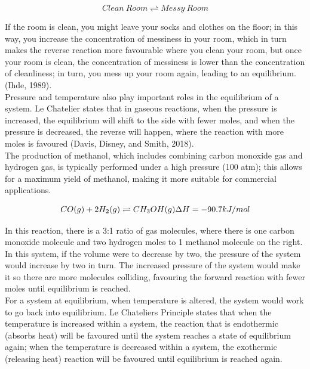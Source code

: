 \begin{figure}[htp]
    \centering
    \[
        Clean \ Room \rightleftharpoons Messy \ Room
    \]
    \caption{}
    \label{fig:enter-label}
\end{figure}

If the room is clean, you might leave your socks and clothes on the floor; in this way, you increase the concentration of messiness in your room, which in turn makes the reverse reaction more favourable where you clean your room, but once your room is clean, the concentration of messiness is lower than the concentration of cleanliness; in turn, you mess up your room again, leading to an equilibrium. (Ihde, 1989). \\

Pressure and temperature also play important roles in the equilibrium of a system. Le Chatelier states that in gaseous reactions, when the pressure is increased, the equilibrium will shift to the side with fewer moles, and when the pressure is decreased, the reverse will happen, where the reaction with more moles is favoured (Davis, Disney, and Smith, 2018). \\

The production of methanol, which includes combining carbon monoxide gas and hydrogen gas, is typically performed under a high pressure (100 atm); this allows for a maximum yield of methanol, making it more suitable for commercial applications. 

\begin{figure}[htp]
    \centering
    \[
       CO (g) + 2H_{2} (g) \rightleftharpoons CH_{3}OH(g) \\
    	\Delta H = -90.7 kJ/mol
    \]
    \caption{}
    \label{fig:enter-label}
\end{figure}

In this reaction, there is a 3:1 ratio of gas molecules, where there is one carbon monoxide molecule and two hydrogen moles to 1 methanol molecule on the right. In this system, if the volume were to decrease by two, the pressure of the system would increase by two in turn. The increased pressure of the system would make it so there are more molecules colliding, favouring the forward reaction with fewer moles until equilibrium is reached. \\

For a system at equilibrium, when temperature is altered, the system would work to go back into equilibrium. Le Chateliers Principle states that when the temperature is increased within a system, the reaction that is endothermic (absorbs heat) will be favoured until the system reaches a state of equilibrium again; when the temperature is decreased within a system, the exothermic (releasing heat) reaction will be favoured until equilibrium is reached again. \\

